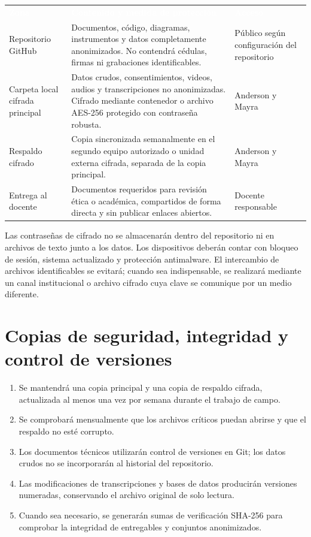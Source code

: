 \documentclass[10pt,a4paper]{article}
\begin{document}
\noindent\begin{tabularx}{\textwidth}{@{}L{3.25cm} J L{3.15cm}@{}}
\textcolor{white}{\textbf{Zona}} &
\textcolor{white}{\textbf{Contenido y medida de protección}} &
\textcolor{white}{\textbf{Acceso}}\\
Repositorio GitHub & Documentos, código, diagramas, instrumentos y datos completamente anonimizados. No contendrá cédulas, firmas ni grabaciones identificables. & Público según configuración del repositorio\\
Carpeta local cifrada principal & Datos crudos, consentimientos, videos, audios y transcripciones no anonimizadas. Cifrado mediante contenedor o archivo AES-256 protegido con contraseña robusta. & Anderson y Mayra\\
Respaldo cifrado & Copia sincronizada semanalmente en el segundo equipo autorizado o unidad externa cifrada, separada de la copia principal. & Anderson y Mayra\\
Entrega al docente & Documentos requeridos para revisión ética o académica, compartidos de forma directa y sin publicar enlaces abiertos. & Docente responsable\\
\end{tabularx}

Las contraseñas de cifrado no se almacenarán dentro del repositorio ni en archivos de texto junto a los datos. Los dispositivos deberán contar con bloqueo de sesión, sistema actualizado y protección antimalware. El intercambio de archivos identificables se evitará; cuando sea indispensable, se realizará mediante un canal institucional o archivo cifrado cuya clave se comunique por un medio diferente.

\section{Copias de seguridad, integridad y control de versiones}

\begin{enumerate}
  \item Se mantendrá una copia principal y una copia de respaldo cifrada, actualizada al menos una vez por semana durante el trabajo de campo.
  \item Se comprobará mensualmente que los archivos críticos puedan abrirse y que el respaldo no esté corrupto.
  \item Los documentos técnicos utilizarán control de versiones en Git; los datos crudos no se incorporarán al historial del repositorio.
  \item Las modificaciones de transcripciones y bases de datos producirán versiones numeradas, conservando el archivo original de solo lectura.
  \item Cuando sea necesario, se generarán sumas de verificación SHA-256 para comprobar la integridad de entregables y conjuntos anonimizados.
\end{enumerate}
\end{document}
